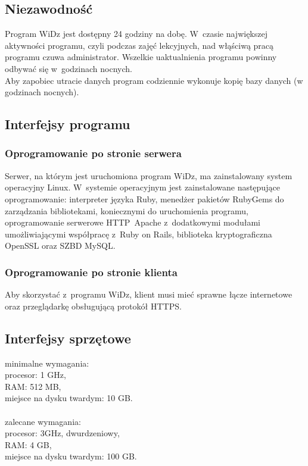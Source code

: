 \documentclass[12pt,leqno,twoside]{mwart}
\begin{document}
\subsection{Niezawodność}
\noindent Program WiDz jest dostępny 24 godziny na dobę. W~czasie największej aktywności programu, czyli podczas zajęć lekcyjnych, nad włąściwą pracą programu czuwa administrator. Wszelkie uaktualnienia programu powinny odbywać się w~godzinach nocnych.\\
\indent Aby zapobiec utracie danych program codziennie wykonuje kopię bazy danych (w godzinach nocnych).

\subsection{Interfejsy programu}
\subsubsection{Oprogramowanie po stronie serwera}
\noindent Serwer, na którym jest uruchomiona program WiDz, ma zainstalowany system operacyjny Linux. W~systemie operacyjnym jest zainstalowane następujące oprogramowanie: interpreter języka Ruby, menedżer pakietów RubyGems do zarządzania bibliotekami, koniecznymi do uruchomienia programu, oprogramowanie serwerowe HTTP~Apache z~dodatkowymi modułami umożliwiającymi współpracę z~Ruby on Rails, biblioteka kryptograficzna OpenSSL oraz SZBD MySQL.

\subsubsection{Oprogramowanie po stronie klienta}
\noindent Aby skorzystać z~programu WiDz, klient musi mieć sprawne łącze internetowe oraz przeglądarkę obsługującą protokół HTTPS.

\subsection{Interfejsy sprzętowe}
\noindent minimalne wymagania:\\
	\indent procesor: 1 GHz, \\
	\indent RAM: 512 MB, \\
	\indent miejsce na dysku twardym: 10 GB. \\
\noindent \\
\noindent zalecane wymagania: \\
	\indent procesor: 3GHz, dwurdzeniowy, \\
	\indent RAM: 4 GB, \\ 
	\indent miejsce na dysku twardym: 100 GB. \\
\end{document}
